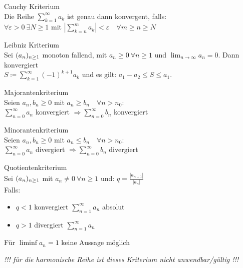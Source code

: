 \begin{concept} {Cauchy Kriterium}\\
    Die Reihe $\sum_{k=1}^\infty a_k$ ist genau dann konvergent, falls:\\
    $\forall \varepsilon > 0 ~\exists N \geq 1$ mit $\left|\sum_{k=n}^m a_k \right| < \varepsilon \quad \forall m \geq n \geq N$
\end{concept}

\begin{concept} {Leibniz Kriterium}\\
    Sei $(a_n)_{n \geq 1}$ monoton fallend, mit $a_n \geq 0~\forall n \geq 1$ und $\lim_{n \to \infty} a_n = 0$. Dann konvergiert\\
    $S \coloneqq \sum_{k = 1}^{\infty} (-1)^{k+1} a_k$
    und es gilt: $a_1 - a_2 \leq S \leq a_1$.
\end{concept}

\begin{concept} {Majorantenkriterium}\\
    Seien $a_n, b_n \geq 0$ mit $a_n \geq b_n \quad \forall n > n_0$:\\
    $\sum_{n=0}^\infty a_n$ konvergiert $\Rightarrow \sum_{n=0}^\infty b_n$ konvergiert 
\end{concept}

\begin{concept} {Minorantenkriterium}\\
    Seien $a_n, b_n \geq 0$ mit $a_n \leq b_n \quad \forall n > n_0$:\\
    $\sum_{n=0}^\infty a_n$ divergiert $\Rightarrow \sum_{n=0}^\infty b_n$ divergiert 
\end{concept}

\begin{concept} {Quotientenkriterium}\\
    Sei $(a_n)_{n \geq 1}$ mit $a_n \neq 0~\forall n \geq 1$ und: $q = \frac{|a_{n + 1}|}{|a_n|}$\\
    Falls:
    \begin{itemize}
        \item $q < 1$ konvergiert $\sum_{n=1}^\infty a_n$ absolut
        \item $q > 1$ divergiert $\sum_{n=1}^\infty a_n$
    \end{itemize}
    Für $\liminf a_n = 1$ keine Aussage möglich

    \emph{!!! für die harmonische Reihe ist dieses Kriterium nicht anwendbar/gültig !!!}
\end{concept}

